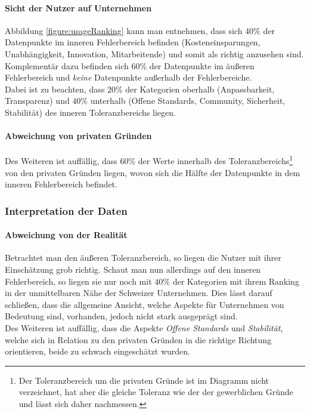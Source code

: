 \documentclass[a4paper]{article}
\begin{document}
                \paragraph{Sicht der Nutzer auf Unternehmen}
                    Abbildung \ref{figure:usageRanking} kann man entnehmen, dass sich $40\%$ der Datenpunkte im inneren Fehlerbereich befinden ({\scriptsize Kosteneinsparungen, Unabhängigkeit, Innovation, Mitarbeitende}) und somit als richtig anzusehen sind. Komplementär dazu befinden sich $60\%$ der Datenpunkte im äußeren Fehlerbereich und \emph{keine} Datenpunkte außerhalb der Fehlerbereiche.\\
                    Dabei ist zu beachten, dass $20\%$ der Kategorien oberhalb ({\scriptsize Anpassbarkeit, Transparenz}) und $40\%$ unterhalb ({\scriptsize Offene Standards, Community, Sicherheit, Stabilität}) des inneren Toleranzbereichs liegen.
                    
                \paragraph{Abweichung von privaten Gründen}
                    Des Weiteren ist auffällig, dass $60\%$ der Werte innerhalb des Toleranzbereichs\footnote{Der Toleranzbereich um die privaten Gründe ist im Diagramm nicht verzeichnet, hat aber die gleiche Toleranz wie der der gewerblichen Gründe und lässt sich daher nachmessen.} von den privaten Gründen liegen, wovon sich die Hälfte der Datenpunkte in dem inneren Fehlerbereich befindet.
                               
            \subsubsection{Interpretation der Daten}
                \paragraph{Abweichung von der Realität}
                    Betrachtet man den äußeren Toleranzbereich, so liegen die Nutzer mit ihrer Einschätzung grob richtig. Schaut man nun allerdings auf den inneren Fehlerbereich, so liegen sie nur noch mit $40\%$ der Kategorien mit ihrem Ranking in der unmittelbaren Nähe der Schweizer Unternehmen. Dies lässt darauf schließen, dass die allgemeine Ansicht, welche Aspekte für Unternehmen von Bedeutung sind, vorhanden, jedoch nicht stark ausgeprägt sind.\\
                    Des Weiteren ist auffällig, dass die Aspekte \emph{Offene Standards} und \emph{Stabilität}, welche sich in Relation zu den privaten Gründen in die richtige Richtung orientieren, beide zu schwach eingeschätzt wurden. %
                    
\end{document}
